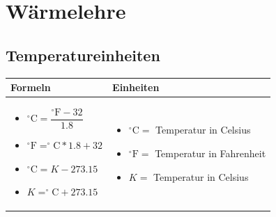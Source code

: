 \newpage
\section{Wärmelehre}

\subsection{Temperatureinheiten}				%
\begin{table}[h!]
	\begin{tabular}{ | m{9cm} | m{9cm}  | }
		\hline
		Formeln & Einheiten \\ \hline
		\midrule
		\begin{itemize}
			\item $^\circ\text{C}=\dfrac{^\circ\text{F}-32}{1.8}$
			\item $^\circ\text{F}=^\circ\text{C}*1.8+32$
			\item $^\circ\text{C}=K-273.15$
			\item $K=^\circ\text{C}+273.15$
			
		\end{itemize}
		&
		\begin{itemize}
			\item $^\circ\text{C}=$ Temperatur in Celsius
			\item $^\circ\text{F}=$ Temperatur in Fahrenheit
			\item $K=$ Temperatur in Celsius
		\end{itemize}
		\\ \hline
	\end{tabular}
\end{table}

